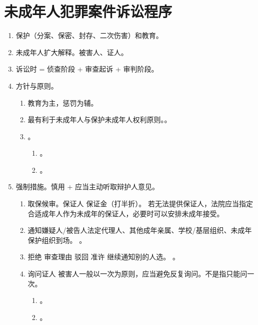 \section{未成年人犯罪案件诉讼程序}
\begin{enumerate}
  \item 保护（分案、保密、封存、二次伤害）和教育。
  \item 未成年人扩大解释。被害人、证人。
  \item 诉讼时 = 侦查阶段 + 审查起诉 + 审判阶段。
  \item 方针与原则。
        \begin{enumerate}
          \item 教育为主，惩罚为辅。
          \item 最有利于未成年人与保护未成年人权利原则。。
          \item {}。
                \begin{enumerate}
                  \item {}。
                  \item {}。
                \end{enumerate}
        \end{enumerate}
  \item 强制措施。慎用 + 应当主动听取辩护人意见。
        \begin{enumerate}
          \item 取保候审。保证人 \dy 保证金（打半折）。
                若无法提供保证人，法院应当指定合适成年人作为未成年的保证人，必要时可以安排未成年接受。
          \item 通知嫌疑人/被告人法定代理人、其他成年亲属、学校/基层组织、未成年保护组织到场。
                。
          \item 拒绝 \yjt 审查理由 \yjt 驳回 \hz 准许 \yjt 继续通知别的人选。
                。
          \item 询问证人 \hz 被害人一般以一次为原则，应当避免反复询问。不是指只能问一次。
                \begin{enumerate}
                  \item {}。
                  \item {}。
                \end{enumerate}

\end{enumerate}
\end{enumerate}

